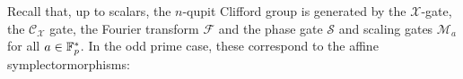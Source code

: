 %
%
%
Recall that, up to scalars, the $n$-qupit Clifford group is generated by the $\mathcal X$-gate, the $\mathcal{C}_\mathcal{X}$ gate, the Fourier transform $\mathcal F$ and the phase gate $\mathcal S$ and scaling gates $\mathcal{M}_a$ for all $a \in \mathbb{F}_p^*$.
In the odd prime case, these correspond to the affine symplectormorphisms:
